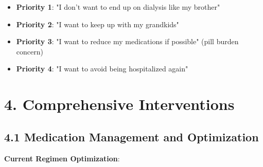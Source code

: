 \documentclass[11pt,letterpaper]{article}
\begin{document}
\begin{itemize}[leftmargin=*]
    \item \textbf{Priority 1}: "I don't want to end up on dialysis like my brother"
    \item \textbf{Priority 2}: "I want to keep up with my grandkids"
    \item \textbf{Priority 3}: "I want to reduce my medications if possible" (pill burden concern)
    \item \textbf{Priority 4}: "I want to avoid being hospitalized again"
\end{itemize}

\section*{4. Comprehensive Interventions}

\subsection*{4.1 Medication Management and Optimization}

\textbf{Current Regimen Optimization}:
\end{document}
